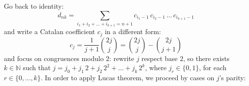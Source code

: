 \documentclass[11pt,a4paper]{article} %
\begin{document}
    Go back to identity:
    \begin{displaymath}
        d_{nk} = \sum_{i_{1}+ i_{2}+ \ldots+ i_{k+1}=n+1}{
                c_{i_{1}-1}\,c_{i_{2}-1}\,\ldots\,c_{i_{k+1}-1} }
    \end{displaymath}
    and write a Catalan coefficient $c_{j}$ in a different form:
    \begin{displaymath}
        c_{j} = \frac{1}{j+1}{{2j}\choose{j}} 
            = {{2j}\choose{j}} - {{2j}\choose{j+1}}
    \end{displaymath}
    and focus on congruences modulo $2$: rewrite $j$ respect base $2$, 
    so there exists $k\in\mathbb{N}$ such that 
    $j=j_{0} + j_{1}\,2 + j_{2}\,2^{2} + \ldots + j_{k}\,2^{k}$, where
    $j_{r}\in\lbrace0,1\rbrace$, for each $r\in\lbrace0,\ldots,k\rbrace$. 
    In order to apply Lucas theorem, we proceed by cases on $j$'s parity:
\end{document}
